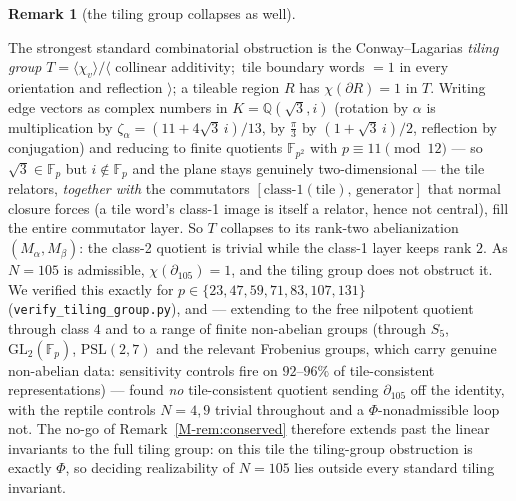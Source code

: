 \documentclass[11pt,reqno]{amsart}
\theoremstyle{plain}
\theoremstyle{definition}
\newtheorem{remark}[theorem]{Remark}
\newcommand{\Q}{\mathbb{Q}}
\begin{document}
\begin{remark}[the tiling group collapses as well]\label{OM-tilinggroup}

The strongest standard combinatorial obstruction is the Conway--Lagarias \emph{tiling group}
$T=\langle\chi_v\rangle/\langle$ collinear additivity;\ tile boundary words $=1$ in every orientation
and reflection $\rangle$; a tileable region $R$ has $\chi(\partial R)=1$ in $T$. Writing edge vectors
as complex numbers in $K=\Q(\sqrt3,i)$ (rotation by $\alpha$ is multiplication by
$\zeta_\alpha=(11+4\sqrt3\,i)/13$, by $\tfrac\pi3$ by $(1+\sqrt3\,i)/2$, reflection by conjugation)
and reducing to finite quotients $\mathbb F_{p^2}$ with $p\equiv11\pmod{12}$ --- so $\sqrt3\in\mathbb
F_p$ but $i\notin\mathbb F_p$ and the plane stays genuinely two-dimensional --- the tile relators,
\emph{together with} the commutators $[\text{class-1}(\text{tile}),\,\text{generator}]$ that normal
closure forces (a tile word's class-1 image is itself a relator, hence not central), fill the entire
commutator layer. So $T$ collapses to its rank-two abelianization $(M_\alpha,M_\beta)$: the class-2
quotient is trivial while the class-1 layer keeps rank $2$. As $N=105$ is admissible,
$\chi(\partial_{105})=1$, and the tiling group does not obstruct it. We verified this exactly for
$p\in\{23,47,59,71,83,107,131\}$ (\texttt{verify\_tiling\_group.py}), and --- extending to the free
nilpotent quotient through class $4$ and to a range of finite non-abelian groups (through $S_5$,
$\mathrm{GL}_2(\mathbb F_p)$, $\mathrm{PSL}(2,7)$ and the relevant Frobenius groups, which carry
genuine non-abelian data: sensitivity controls fire on $92$--$96\%$ of tile-consistent
representations) --- found \emph{no} tile-consistent quotient sending $\partial_{105}$ off the
identity, with the reptile controls $N=4,9$ trivial throughout and a $\Phi$-nonadmissible loop not.
The no-go of Remark~\ref{M-rem:conserved} therefore extends past the linear invariants to the full
tiling group: on this tile the tiling-group obstruction is exactly $\Phi$, so deciding realizability
of $N=105$ lies outside every standard tiling invariant.
\end{remark}
\end{document}
